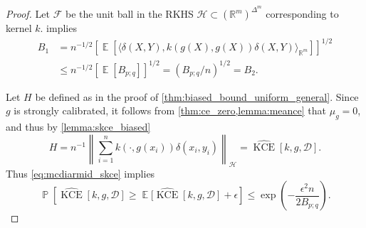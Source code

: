 \documentclass{article}
\DeclareMathOperator{\Prob}{\mathbb{P}}
\DeclareMathOperator{\Expect}{\mathbb{E}}
\DeclareMathOperator{\kernelmeasure}{KCE}
\begin{document}
\begin{proof}
  Let $\mathcal{F}$ be the unit ball in the RKHS
  $\mathcal{H} \subset {(\mathbb{R}^m)}^{\Delta^m}$ corresponding to kernel $k$.
   implies
  \begin{equation}\label{eq:Bi_inequality}
    \begin{split}
      B_1 &= n^{-1/2} \left[\Expect\left[\langle \delta(X, Y), k(g(X), g(X)) \delta(X,Y)\rangle_{\mathbb{R}^m}\right] \right]^{1/2} \\
      &\leq n^{-1/2} \left[\Expect[B_{p;q}] \right]^{1/2} = {(B_{p;q}/n)}^{1/2} = B_2.
    \end{split}
  \end{equation}

  Let $H$ be defined as in the proof of \cref{thm:biased_bound_uniform_general}.
  Since $g$ is strongly calibrated, it follows from
  \cref{thm:ce_zero,lemma:meance} that $\mu_g = 0$, and thus by
  \cref{lemma:skce_biased}
  \begin{equation*}
    H = n^{-1} \left\|\sum_{i=1}^n k(\cdot, g(x_i)) \delta(x_i, y_i)\right\|_{\mathcal{H}} = \widehat{\kernelmeasure}[k, g, \mathcal{D}].
  \end{equation*}
  Thus \cref{eq:mcdiarmid_skce} implies
  \begin{equation}\label{eq:mcdiarmid_skce_measure}
    \Prob\left[\widehat{\kernelmeasure}[k, g, \mathcal{D}] \geq \Expect[\widehat{\kernelmeasure}[k, g, \mathcal{D}] + \epsilon\right] \leq \exp{\left(- \frac{\epsilon^2 n}{2 B_{p;q}}\right)}.
  \end{equation}


\end{proof}
\end{document}
